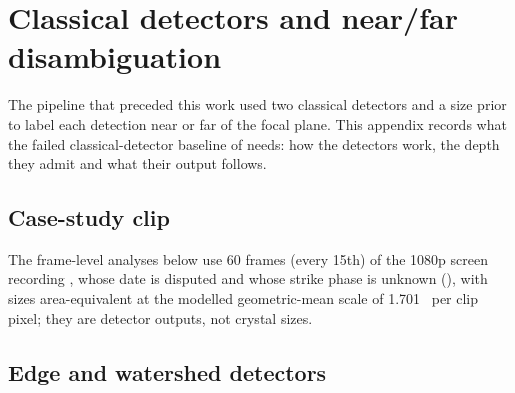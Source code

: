 \section{Classical detectors and near/far disambiguation}\label{app:detectors}

The pipeline that preceded this work used two classical detectors and a size prior to label each detection near or
far of the focal plane. This appendix records what the failed classical-detector baseline of 
needs: how the detectors work, the depth they admit and what their output follows.

\subsection{Case-study clip}\label{sec:recording}

The frame-level analyses below use 60 frames (every 15th) of the 1080p screen recording ,
whose date is disputed and whose strike phase is unknown (), with sizes
area-equivalent at the modelled geometric-mean scale of 1.701~\um{} per clip pixel; they are detector outputs, not
crystal sizes.

\subsection{Edge and watershed detectors}\label{sec:edge}

